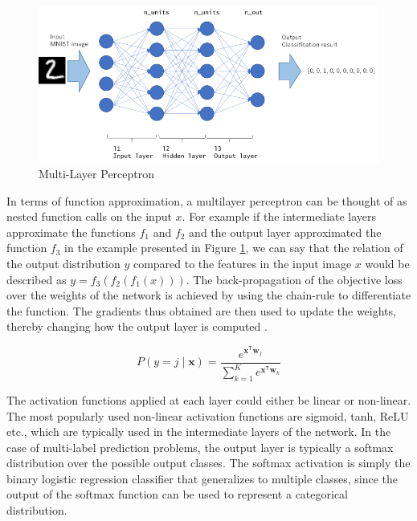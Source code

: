 \begin{figure}[ht]
	\centering
	\includegraphics[width=\textwidth]{images/mlp-network}
	\caption{\label{fig:mlp-network} Multi-Layer Perceptron}
\end{figure}

In terms of function approximation, a multilayer perceptron can be thought of as nested function calls on the input $x$. For example if the intermediate layers approximate the functions $f_1$ and $f_2$ and the output layer approximated the function $f_3$ in the example presented in Figure \ref{fig:mlp-network}, we can say that the relation of the output distribution $y$ compared to the features in the input image $x$ would be described as $y = f_3(f_2(f_1(x)))$. The back-propagation of the objective loss over the weights of the network is achieved by using the chain-rule to differentiate the function. The gradients thus obtained are then used to update the weights, thereby changing how the output layer is computed \citep{lecun1989backpropagation}.

\begin{equation}
	P(y=j \mid \mathbf{x}) = \frac{e^{\mathbf{x}^\mathsf{T}\mathbf{w}_j}}{\sum_{k=1}^K e^{\mathbf{x}^\mathsf{T}\mathbf{w}_k}}
\end{equation}

The activation functions applied at each layer could either be linear or non-linear. The most popularly used non-linear activation functions are sigmoid, tanh, ReLU etc., which are typically used in the intermediate layers of the network. In the case of multi-label prediction problems, the output layer is typically a softmax distribution over the possible output classes. The softmax activation is simply the binary logistic regression classifier that generalizes to multiple classes, since the output of the softmax function can be used to represent a categorical distribution.

